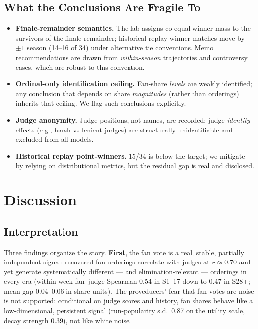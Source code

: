 \documentclass[11pt]{article}
\begin{document}
\subsection{What the Conclusions Are Fragile To}

\begin{itemize}[leftmargin=2em]
\item \textbf{Finale-remainder semantics.} The lab assigns co-equal winner mass to
the survivors of the finale remainder; historical-replay winner matches move by
$\pm 1$ season (14--16 of 34) under alternative tie conventions. Memo
recommendations are drawn from \emph{within-season} trajectories and controversy
cases, which are robust to this convention.
\item \textbf{Ordinal-only identification ceiling.} Fan-share \emph{levels} are
weakly identified; any conclusion that depends on share \emph{magnitudes} (rather
than orderings) inherits that ceiling. We flag such conclusions explicitly.
\item \textbf{Judge anonymity.} Judge positions, not names, are recorded; judge-\emph{identity}
effects (e.g., harsh vs lenient judges) are structurally unidentifiable and excluded
from all models.
\item \textbf{Historical replay point-winners.} 15/34 is below the target; we
mitigate by relying on distributional metrics, but the residual gap is real and
disclosed.
\end{itemize}

\section{Discussion}
\label{sec:discussion}

\subsection{Interpretation}

Three findings organize the story. \textbf{First}, the fan vote is a real, stable,
partially independent signal: recovered fan orderings correlate with judges at
$r \approx 0.70$ and yet generate systematically different --- and
elimination-relevant --- orderings in every era (within-week fan--judge Spearman
0.54 in S1--17 down to 0.47 in S28+; mean gap 0.04--0.06 in share units). The
proveducers' fear that fan votes are noise is not supported: conditional on judge
scores and history, fan shares behave like a low-dimensional, persistent signal
(run-popularity s.d.\ 0.87 on the utility scale, decay strength 0.39), not like
white noise.
\end{document}
